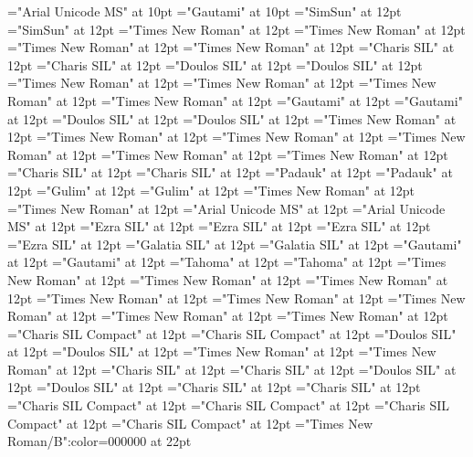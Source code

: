\documentclass[a4paper,twoside]{article}
\begin{document}
\font\xitemhi="Arial Unicode MS" at 10pt
\font\xitemte="Gautami" at 10pt
\font\spanzhCN="SimSun" at 12pt
\font\divzhCN="SimSun" at 12pt
\font\spanur="Times New Roman" at 12pt
\font\divur="Times New Roman" at 12pt
\font\spanurxind="Times New Roman" at 12pt
\font\divurxind="Times New Roman" at 12pt
\font\spantr="Charis SIL" at 12pt
\font\divtr="Charis SIL" at 12pt
\font\spantrfonipa="Doulos SIL" at 12pt
\font\divtrfonipa="Doulos SIL" at 12pt
\font\spantrfonipaxemic="Times New Roman" at 12pt
\font\divtrfonipaxemic="Times New Roman" at 12pt
\font\spantpi="Times New Roman" at 12pt
\font\divtpi="Times New Roman" at 12pt
\font\spante="Gautami" at 12pt
\font\divte="Gautami" at 12pt
\font\spanseh="Doulos SIL" at 12pt
\font\divseh="Doulos SIL" at 12pt
\font\spanru="Times New Roman" at 12pt
\font\divru="Times New Roman" at 12pt
\font\spanqaaxcam="Times New Roman" at 12pt
\font\divqaaxcam="Times New Roman" at 12pt
\font\spanpt="Times New Roman" at 12pt
\font\divpt="Times New Roman" at 12pt
\font\spannko="Charis SIL" at 12pt
\font\divnko="Charis SIL" at 12pt
\font\spanmy="Padauk" at 12pt
\font\divmy="Padauk" at 12pt
\font\spanko="Gulim" at 12pt
\font\divko="Gulim" at 12pt
\font\spanid="Times New Roman" at 12pt
\font\divid="Times New Roman" at 12pt
\font\spanhi="Arial Unicode MS" at 12pt
\font\divhi="Arial Unicode MS" at 12pt
\font\spanhe="Ezra SIL" at 12pt
\font\divhe="Ezra SIL" at 12pt
\font\spanhbo="Ezra SIL" at 12pt
\font\divhbo="Ezra SIL" at 12pt
\font\spangrc="Galatia SIL" at 12pt
\font\divgrc="Galatia SIL" at 12pt
\font\spanggoTeluIN="Gautami" at 12pt
\font\divggoTeluIN="Gautami" at 12pt
\font\spanggofonipaxemic="Tahoma" at 12pt
\font\divggofonipaxemic="Tahoma" at 12pt
\font\spanfr="Times New Roman" at 12pt
\font\divfr="Times New Roman" at 12pt
\font\spanfa="Times New Roman" at 12pt
\font\divfa="Times New Roman" at 12pt
\font\spanes="Times New Roman" at 12pt
\font\dives="Times New Roman" at 12pt
\font\spanen="Times New Roman" at 12pt
\font\diven="Times New Roman" at 12pt
\font\spanenQaaaxtest="Charis SIL Compact" at 12pt
\font\divenQaaaxtest="Charis SIL Compact" at 12pt
\font\spanenfonipa="Doulos SIL" at 12pt
\font\divenfonipa="Doulos SIL" at 12pt
\font\spande="Times New Roman" at 12pt
\font\divde="Times New Roman" at 12pt
\font\spanbzh="Charis SIL" at 12pt
\font\divbzh="Charis SIL" at 12pt
\font\spanbzhfonipa="Doulos SIL" at 12pt
\font\divbzhfonipa="Doulos SIL" at 12pt
\font\spanbss="Charis SIL" at 12pt
\font\divbss="Charis SIL" at 12pt
\font\spanbssxako="Charis SIL Compact" at 12pt
\font\divbssxako="Charis SIL Compact" at 12pt
\font\spanbssfonipa="Charis SIL Compact" at 12pt
\font\divbssfonipa="Charis SIL Compact" at 12pt
\color{black} 
\thispagestyle{empty} 
\font\CoverPageHeading="Times New Roman/B":color=000000 at 22pt 
\vskip 60pt 
\begin{center} 
\end{center} 
\newpage 
\newpage 
\thispagestyle{empty} 
\mbox{} 
\end{document}
